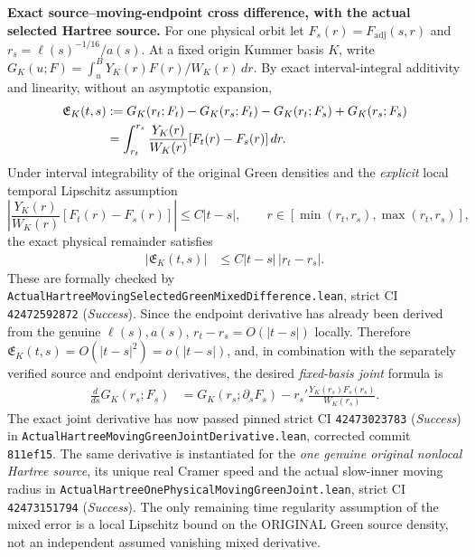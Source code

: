 \documentclass[11pt]{amsart}
\begin{document}
\medskip
\noindent\textbf{Exact source--moving-endpoint cross difference, with
the actual selected Hartree source.}
For one physical orbit let
\(
F_s(r)=F_{\mathrm{adj}}(s,r)
\)
and
\(
r_s=\ell(s)^{-1/16}/a(s)
\).
At a fixed origin Kummer basis \(K\), write
\(
G_K(u;F)=\int_u^B Y_K(r)F(r)/W_K(r)\,dr
\).
By exact interval-integral additivity and linearity, without
an asymptotic expansion,
\begin{align}
\mathfrak E_K(t,s)
 &:=
 G_K(r_t;F_t)-G_K(r_s;F_t)
 -G_K(r_t;F_s)+G_K(r_s;F_s)\notag\\
 &=\int_{r_t}^{r_s}
    \frac{Y_K(r)}{W_K(r)}
       [F_t(r)-F_s(r)]\,dr .
 \label{eq:true-hartree-green-source-endpoint-cross}
\end{align}
Under interval integrability of the original Green densities and the
\emph{explicit} local temporal Lipschitz assumption
\[
 \left|\frac{Y_K(r)}{W_K(r)}
       [F_t(r)-F_s(r)]\right|
 \le C|t-s|,\qquad
 r\in[\min(r_t,r_s),\max(r_t,r_s)],
\]
the exact physical remainder satisfies
\begin{align}
 |\mathfrak E_K(t,s)|
 &\le C|t-s|\,|r_t-r_s|.\label{eq:true-hartree-green-cross-bound}
\end{align}
These are formally checked by
\texttt{ActualHartreeMovingSelectedGreenMixedDifference.lean},
strict CI \texttt{42472592872} (\emph{Success}).
Since the endpoint derivative has already been derived from the genuine
\(\ell(s),a(s)\), \(r_t-r_s=O(|t-s|)\) locally. Therefore
\(\mathfrak E_K(t,s)=O(|t-s|^2)=o(|t-s|)\), and, in combination
with the separately verified source and endpoint derivatives,
the desired \emph{fixed-basis joint} formula is
\begin{align}
 \frac{d}{ds}G_K(r_s;F_s)
 &=G_K(r_s;\partial_sF_s)
   -r_s'\frac{Y_K(r_s)F_s(r_s)}{W_K(r_s)}.
 \label{eq:true-hartree-green-joint-source-endpoint-derivative}
\end{align}
The exact joint derivative has now passed pinned strict CI
\texttt{42473023783} (\emph{Success}) in
\texttt{ActualHartreeMovingGreenJointDerivative.lean}, corrected
commit \texttt{811ef15}. The same derivative is instantiated
for the \emph{one genuine original nonlocal Hartree source}, its
unique real Cramer speed and the actual slow-inner moving radius
in \texttt{ActualHartreeOnePhysicalMovingGreenJoint.lean},
strict CI \texttt{42473151794} (\emph{Success}).
The only remaining time regularity assumption of the mixed error
is a local Lipschitz bound on the ORIGINAL Green source density,
not an independent assumed vanishing mixed derivative.
\end{document}
